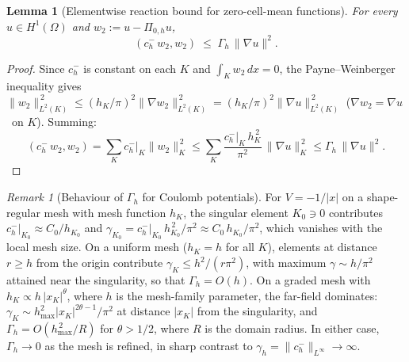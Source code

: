 \documentclass[11pt]{article}
\theoremstyle{plain}
\newtheorem{lemma}{Lemma}
\theoremstyle{definition}
\theoremstyle{remark}
\newtheorem{remark}{Remark}
\newcommand{\dx}{\,dx}
\begin{document}
\begin{lemma}[Elementwise reaction bound for zero-cell-mean functions]
\label{lem:reaction-w2}
For every $u\in H^1(\Omega)$ and $w_2:=u-\Pi_{0,h}u$,
\begin{equation}
\label{eq:reaction-w2}
  (c_h^-\,w_2,w_2)
  \;\le\; \Gamma_h\,\|\nabla u\|^2.
\end{equation}
\end{lemma}

\begin{proof}
Since $c_h^-$ is constant on each $K$ and
$\int_K w_2\dx=0$, the Payne--Weinberger inequality gives
$\|w_2\|_{L^2(K)}^{\,2}\le(h_K/\pi)^2\|\nabla w_2\|_{L^2(K)}^{\,2}
=(h_K/\pi)^2\|\nabla u\|_{L^2(K)}^{\,2}$
($\nabla w_2=\nabla u$ \ on $K$). Summing:
\[
  (c_h^-\,w_2,w_2)
  = \sum_K c_h^-\big|_K\|w_2\|_K^{\,2}
  \le \sum_K \frac{c_h^-|_K\,h_K^{\,2}}{\pi^2}\,\|\nabla u\|_K^{\,2}
  \le \Gamma_h\,\|\nabla u\|^2.
\]
\end{proof}

\begin{remark}[Behaviour of $\Gamma_h$ for Coulomb potentials]
\label{rmk:Gamma-h-rate}
For $V=-1/|x|$ on a shape-regular mesh with mesh
function $h_K$, the singular element $K_0\ni 0$ contributes
$c_h^-|_{K_0}\approx C_0/h_{K_0}$ and
$\gamma_{K_0}=c_h^-|_{K_0}\,h_{K_0}^{\,2}/\pi^2
\approx C_0\,h_{K_0}/\pi^2$,
which vanishes with the local mesh size.  On a uniform mesh
($h_K=h$ for all $K$), elements at distance $r\ge h$ from the
origin contribute
$\gamma_K\le h^2/(r\pi^2)$, with maximum $\gamma\sim h/\pi^2$ attained
near the singularity, so that $\Gamma_h=O(h)$.  On a
graded mesh with $h_K\propto h\,|x_K|^\theta$, where $h$ is the
mesh-family parameter, the far-field dominates:
$\gamma_K\sim h_{\max}^2|x_K|^{2\theta-1}/\pi^2$
at distance $|x_K|$ from the singularity, and
$\Gamma_h=O(h_{\max}^{\,2}/R)$ for $\theta>1/2$, where $R$
is the domain radius. In either case, $\Gamma_h\to 0$ as the mesh
is refined,
in sharp contrast to $\gamma_h=\|c_h^-\|_{L^\infty}\to\infty$.
\end{remark}
\end{document}
